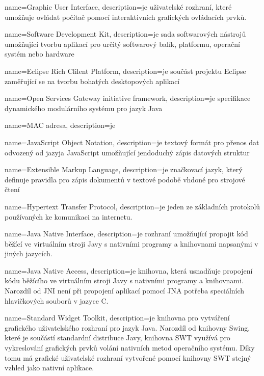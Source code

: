 {
	name=Graphic User Interface,
	description={je uživatelské rozhraní, které umožňuje ovládat počítač pomocí
	interaktivních grafických ovládacích prvků.}
}

{
	name=Software Development Kit,
	description={je sada softwarových nástrojů umožňující tvorbu aplikací pro
	určitý softwarový balík, platformu, operační systém nebo hardware}
}

{
	name=Eclipse Rich Clilent Platform,
	description={je součást projektu Eclipse zaměřující se na tvorbu bohatých
	desktopových aplikací} 
}

{
	name=Open Services Gateway initiative framework,
	description={je specifikace dynamického modulárního systému pro jazyk Java} 
}

{
	name=MAC adresa,
	description={je } 
}

{
	name=JavaScript Object Notation,
	description={je textový formát pro přenos dat odvozený od jazyja JavaScript
	umožňující jendoduchý zápis datových struktur} 
}

{
	name=Extensible Markup Language,
	description={je značkovací jazyk, který definuje pravidla pro zápis dokumentů
	v textové podobě vhdoné pro strojové čtení} 
}

{
	name=Hypertext Transfer Protocol,
	description={je jeden ze základních protokolů používaných ke komunikaci na
	internetu.} 
}

{
	name=Java Native Interface,
	description={je rozhraní umožňující propojit kód běžící ve virtuálním stroji
	Javy s nativními programy a knihovnami napsanými v jiných jazycích.}
}

{
	name=Java Native Access,
	description={je knihovna, která usnadňuje propojení kódu běžícího ve
	virtuálním stroji Javy s nativními programy a knihovnami. Narozdíl od
	JNI není při propojení aplikací pomocí JNA potřeba speciálních hlavičkových
	souborů v jazyce C. }
}

{
	name=Standard Widget Toolkit,
	description={je knihovna pro vytváření grafického uživatelského rozhraní pro
	jazyk Java. Narozdíl od knihovny Swing, které je součástí standardní
	distribuce Javy, knihovna SWT využívá pro vykreslování grafických prvků volání
	nativních metod operačního systému. Díky tomu má grafické uživatelské rozhraní
	vytvořené pomocí knihovny SWT stejný vzhled jako nativní aplikace.}
}


